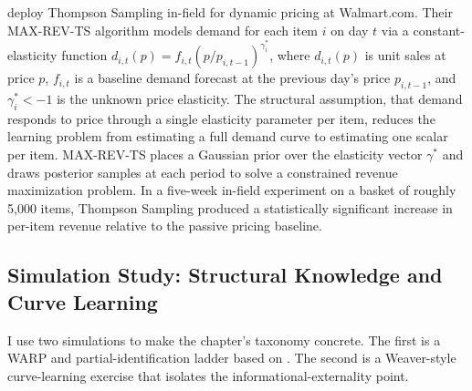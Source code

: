\citet{Ganti2018} deploy Thompson Sampling in-field for dynamic pricing at Walmart.com. Their MAX-REV-TS algorithm models demand for each item $i$ on day $t$ via a constant-elasticity function $d_{i,t}(p) = f_{i,t}(p/p_{i,t-1})^{\gamma_i^*}$, where $d_{i,t}(p)$ is unit sales at price $p$, $f_{i,t}$ is a baseline demand forecast at the previous day's price $p_{i,t-1}$, and $\gamma_i^* < -1$ is the unknown price elasticity. The structural assumption, that demand responds to price through a single elasticity parameter per item, reduces the learning problem from estimating a full demand curve to estimating one scalar per item. MAX-REV-TS places a Gaussian prior over the elasticity vector $\gamma^*$ and draws posterior samples at each period to solve a constrained revenue maximization problem. In a five-week in-field experiment on a basket of roughly 5,000 items, Thompson Sampling produced a statistically significant increase in per-item revenue relative to the passive pricing baseline.

\subsection{Simulation Study: Structural Knowledge and Curve Learning}
\label{sec:bandit_sim}

I use two simulations to make the chapter's taxonomy concrete. The first is a WARP and partial-identification ladder based on \citet{Misra2019}. The second is a Weaver-style curve-learning exercise that isolates the informational-externality point.

